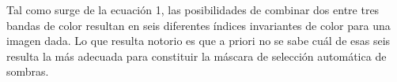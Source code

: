 Tal como surge de la ecuación 1, las posibilidades de combinar dos entre tres bandas de color resultan en seis diferentes índices invariantes de color para una imagen dada. Lo que resulta notorio es que a priori no se sabe cuál de esas seis resulta la más adecuada para constituir la máscara de selección automática de sombras. 

